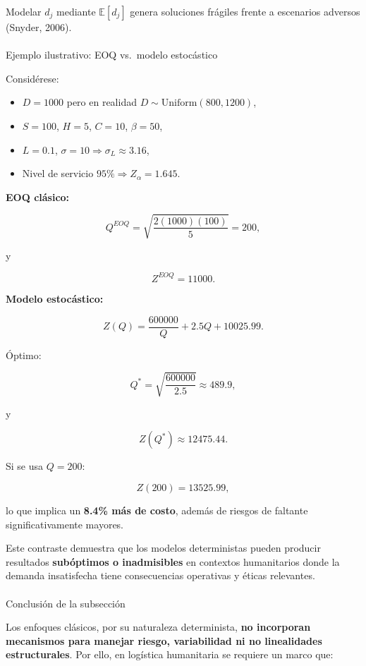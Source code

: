 \documentclass[
  spanish,
  letterpaper,
  DIV=11,
  numbers=noendperiod]{scrartcl}
\makeatletter
\let\oldparagraph\paragraph
\renewcommand{\paragraph}{
    \@ifstar
      \xxxParagraphStar
      \xxxParagraphNoStar
  }
\newcommand{\xxxParagraphStar}[1]{\oldparagraph*{#1}\mbox{}}
\newcommand{\xxxParagraphNoStar}[1]{\oldparagraph{#1}\mbox{}}
\providecommand{\tightlist}{%
  \setlength{\itemsep}{0pt}\setlength{\parskip}{0pt}}
\makeatother
\begin{document}
Modelar \(d_j\) mediante \(\mathbb{E}[d_j]\) genera soluciones frágiles
frente a escenarios adversos (Snyder, 2006).

\paragraph{Ejemplo ilustrativo: EOQ vs.~modelo
estocástico}\label{ejemplo-ilustrativo-eoq-vs.-modelo-estocuxe1stico}

Considérese:

\begin{itemize}
\tightlist
\item
  \(D=1000\) pero en realidad \(D\sim\text{Uniform}(800,1200)\),
\item
  \(S=100\), \(H=5\), \(C=10\), \(\beta=50\),
\item
  \(L=0.1\), \(\sigma=10 \Rightarrow \sigma_L\approx 3.16\),
\item
  Nivel de servicio \(95\% \Rightarrow Z_\alpha=1.645\).
\end{itemize}

\textbf{EOQ clásico:}

\[
Q^{EOQ}=\sqrt{\frac{2(1000)(100)}{5}}=200,
\]

y

\[
Z^{EOQ}=11000.
\]

\textbf{Modelo estocástico:}

\[
Z(Q)=\frac{600000}{Q}+2.5Q+10025.99.
\]

Óptimo:

\[
Q^*=\sqrt{\frac{600000}{2.5}}\approx 489.9,
\]

y

\[
Z(Q^*)\approx 12475.44.
\]

Si se usa \(Q=200\):

\[
Z(200)=13525.99,
\]

lo que implica un \textbf{8.4\% más de costo}, además de riesgos de
faltante significativamente mayores.

Este contraste demuestra que los modelos deterministas pueden producir
resultados \textbf{subóptimos o inadmisibles} en contextos humanitarios
donde la demanda insatisfecha tiene consecuencias operativas y éticas
relevantes.

\paragraph{Conclusión de la
subsección}\label{conclusiuxf3n-de-la-subsecciuxf3n}

Los enfoques clásicos, por su naturaleza determinista, \textbf{no
incorporan mecanismos para manejar riesgo, variabilidad ni no
linealidades estructurales}. Por ello, en logística humanitaria se
requiere un marco que:
\end{document}

